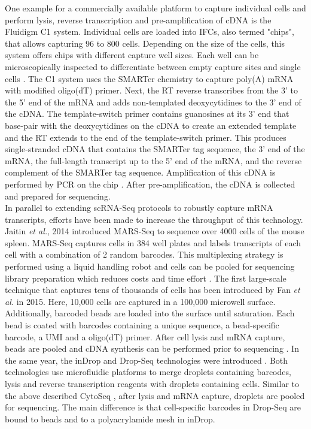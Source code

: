 One example for a commercially available platform to capture individual cells and perform lysis, reverse transcription and pre-amplification of cDNA is the Fluidigm\textsuperscript{\textregistered{}} C1 system. Individual cells are loaded into \glspl{IFC}, also termed "chips", that allows capturing 96 to 800 cells. Depending on the size of the cells, this system offers chips with different capture well sizes. Each well can be microscopically inspected to differentiate between empty capture sites and single cells \citep{Kolodziejczyk2015review}. The C1 system uses the SMARTer\textsuperscript{\textregistered{}} chemistry to capture poly(A) mRNA with modified oligo(dT) primer. Next, the \gls{RT} reverse transcribes from the 3' to the 5' end of the mRNA and adds non-templated deoxycytidines to the 3' end of the cDNA. The template-switch primer contains guanosines at its 3' end that base-pair with the deoxycytidines on the cDNA to create an extended template and the RT extends to the end of the template-switch primer. This produces single-stranded cDNA that contains the SMARTer tag sequence, the 3' end of the mRNA, the full-length transcript up to the 5' end of the mRNA, and the reverse complement of the SMARTer tag sequence. Amplification of this cDNA is performed by PCR on the chip \cite{Fluidigm2015}. After pre-amplification, the cDNA is collected and prepared for sequencing.\\

In parallel to extending scRNA-Seq protocols to robustly capture mRNA transcripts, efforts have been made to increase the throughput of this technology. Jaitin \emph{et al.}, 2014 introduced \gls{MARS-Seq} to sequence over 4000 cells of the mouse spleen. MARS-Seq captures cells in 384 well plates and labels transcripts of each cell with a combination of 2 random barcodes. This multiplexing strategy is performed using a liquid handling robot and cells can be pooled for sequencing library preparation which reduces costs and time effort \citep{Jaitin2014}. The first large-scale technique that captures tens of thousands of cells has been introduced by Fan \emph{et al.} in 2015. Here, 10,000 cells are captured in a 100,000 microwell surface. Additionally, barcoded beads are loaded into the surface until saturation. Each bead is coated with barcodes containing a unique sequence, a bead-specific barcode, a UMI and a oligo(dT) primer. After cell lysis and mRNA capture, beads are pooled and cDNA synthesis can be performed prior to sequencing \citep{Fan2015}. In the same year, the inDrop and Drop-Seq technologies were introduced \citep{Klein2015, Macosko2015}. Both technologies use microfluidic platforms to merge droplets containing barcodes, lysis and reverse transcription reagents with droplets containing cells. Similar to the above described CytoSeq \citep{Fan2015}, after lysis and mRNA capture, droplets are pooled for sequencing. The main difference is that cell-specific barcodes in Drop-Seq are bound to beads and to a polyacrylamide mesh in inDrop.  \\ 

